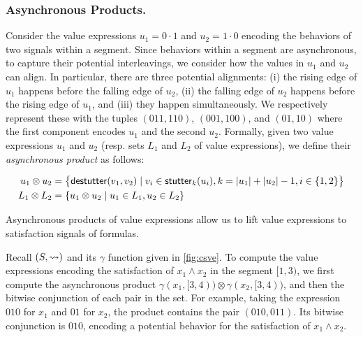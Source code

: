 \subsubsection{Asynchronous Products.}
Consider the value expressions $u_1 = 0 \cdot 1$ and $u_2 = 1 \cdot 0$ encoding the behaviors of two signals within a segment.
Since behaviors within a segment are asynchronous, to capture their potential interleavings, we consider how the values in $u_1$ and $u_2$ can align.
In particular, there are three potential alignments:
(i) the rising edge of $u_1$ happens before the falling edge of $u_2$,
(ii) the falling edge of $u_2$ happens before the rising edge of $u_1$, and
(iii) they happen simultaneously.
We respectively represent these with the tuples $(011, 110)$, $(001, 100)$, and $(01, 10)$ where the first component encodes $u_1$ and the second $u_2$.
Formally, given two value expressions $u_1$ and $u_2$ (resp.  sets $L_1$ and $L_2$ of value expressions), we define their \emph{asynchronous product} as follows:

\vspace{-1.25em}
\small
\begin{align*}
	u_1 \otimes u_2 &= \big\{ \destutter(v_1, v_2) \st v_i \in \stutter_k(u_i), k = |u_1| + |u_2| - 1, i \in 
	\{1,2\} \big\} \\ \vspace{-0.5em}
	L_1 \otimes L_2 &= \{ u_1 \otimes u_2 \st u_1 \in L_1, u_2 \in L_2 \}
\end{align*}
\normalsize

\vspace{-0.5em}
Asynchronous products of value expressions allow us to lift value expressions to satisfaction signals of formulas.

\vspace{-0.5em}
\begin{example} \label{ex:asyncprod}
	Recall $(S, {\rightsquigarrow})$ and its $\gamma$ function given in \cref{fig:csve}.
	To compute the value expressions encoding the satisfaction of $x_1 \land x_2$ in the segment $[1,3)$, we first compute the asynchronous product $\gamma(x_1, [3,4)) \otimes \gamma(x_2, [3,4))$, and then the bitwise conjunction of each pair in the set.
	For example, taking the expression $0  1  0$ for $x_1$ and $0  1$ for $x_2$, the product contains the pair $(010, 011)$.
	Its bitwise conjunction is $0  1  0$, encoding a potential behavior for the satisfaction of $x_1 \land x_2$.
\end{example}

\vspace{-0.7em}
